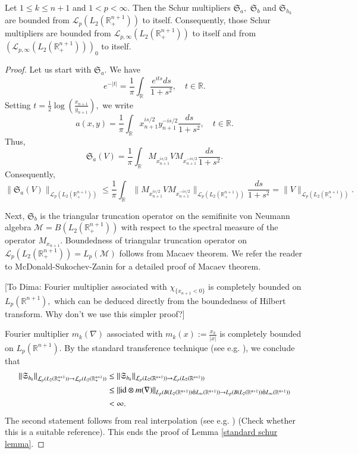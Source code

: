 \documentclass[12pt]{amsart}
\begin{document}
\begin{lemma}\label{standard schur lemma}
Let $1\leq k\leq n+1$ and $1<p<\infty.$ Then the Schur multipliers $\mathfrak{S}_a,$ $\mathfrak{S}_b$ and $\mathfrak{S}_{h_k}$ are bounded from $\mathcal{L}_p(L_2(\mathbb{R}^{n+1}_+))$ to itself. Consequently, those Schur multipliers are bounded from $\mathcal{L}_{p,\infty}(L_2(\mathbb{R}^{n+1}_+))$ to itself and from $(\mathcal{L}_{p,\infty}(L_2(\mathbb{R}^{n+1}_+)))_0$ to itself.
\end{lemma}
\begin{proof} Let us start with $\mathfrak{S}_a.$ We have
$$e^{-|t|}=\frac1{\pi}\int_{\mathbb{R}}\frac{e^{its}ds}{1+s^2},\quad t\in\mathbb{R}.$$
Setting $t=\frac{1}{2}\log(\frac{x_{n+1}}{y_{n+1}}),$ we write
$$a(x,y)=\frac1{\pi}\int_{\mathbb{R}}x_{n+1}^{is/2}y_{n+1}^{-is/2}\frac{ds}{1+s^2},\quad t\in\mathbb{R}.$$
Thus,
$$\mathfrak{S}_a(V)=\frac1{\pi}\int_{\mathbb{R}}M_{x_{n+1}^{is/2}}VM_{x_{n+1}^{-is/2}}\frac{ds}{1+s^2}.$$
Consequently,
$$\|\mathfrak{S}_a(V)\|_{\mathcal{L}_p(L_2(\mathbb{R}^{n+1}_+))}\leq\frac1{\pi}\int_{\mathbb{R}}\|M_{x_{n+1}^{is/2}}VM_{x_{n+1}^{-is/2}}\|_{\mathcal{L}_p(L_2(\mathbb{R}^{n+1}_+))}\frac{ds}{1+s^2}=\|V\|_{\mathcal{L}_p(L_2(\mathbb{R}^{n+1}_+))}.$$

Next, $\mathfrak{S}_b$ is the triangular truncation operator on the semifinite von Neumann algebra $\mathcal{M}=B(L_2(\mathbb{R}^{n+1}_+))$ with respect to the spectral measure of the operator $M_{x_{n+1}}.$ Boundedness of triangular truncation operator on
$\mathcal{L}_p(L_2(\mathbb{R}^{n+1}_+))=L_p(\mathcal{M})$ follows from Macaev theorem. We refer the reader to McDonald-Sukochev-Zanin for a detailed proof of Macaev theorem.

{\color{red}[To Dima: Fourier multiplier associated with $\chi_{\{x_{n+1}<0\}}$ is completely bounded on $L_p(\mathbb{R}^{n+1}),$ which can be deduced directly from the boundedness of Hilbert transform. Why don't we use this simpler proof?] }
	

Fourier multiplier $m_k(\nabla)$ associated with $m_k(x):=\frac{x_{k}}{|x|}$ is completely bounded on $L_p(\mathbb{R}^{n+1}).$ By the standard transference technique (see e.g.  \cite{MR3378821,MR2866074}), we conclude that
\begin{align*}
\|\mathfrak{S}_{h_k}\|_{\mathcal{L}_p(L_2(\mathbb{R}_+^{n+1}))\rightarrow \mathcal{L}_p(L_2(\mathbb{R}_+^{n+1}))}
&\leq \|\mathfrak{S}_{h_k}\|_{\mathcal{L}_p(L_2(\mathbb{R}^{n+1}))\rightarrow \mathcal{L}_p(L_2(\mathbb{R}^{n+1}))}\\
&\leq\|{\rm id}\otimes m(\nabla)\|_{L_p(B(L_2(\mathbb{R}^{n+1}))\bar{\otimes}L_{\infty}(\mathbb{R}^{n+1}))\rightarrow L_p(B(L_2(\mathbb{R}^{n+1}))\bar{\otimes}L_{\infty}(\mathbb{R}^{n+1}))}\\
&<\infty.
\end{align*}
The second statement follows from real interpolation (see e.g. \cite{MR1188788}) {\color{blue}(Check whether this is a suitable reference)}. This ends the proof of Lemma \ref{standard schur lemma}.
\end{proof}
\end{document}
